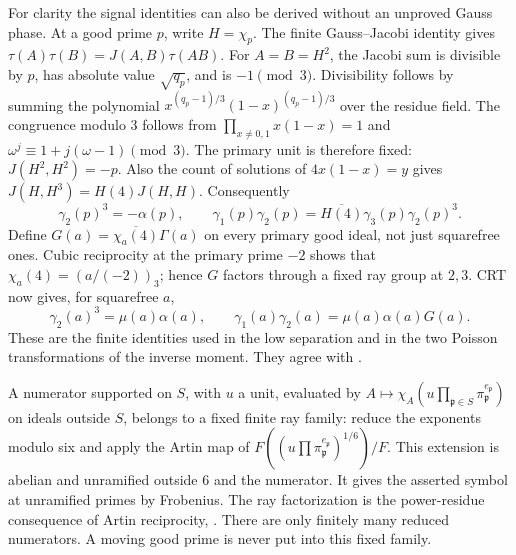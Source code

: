 \documentclass[12pt]{article}
\begin{document}
For clarity the signal identities can also be derived without an
unproved Gauss phase.  At a good prime \(p\), write \(H=\chi_p\).
The finite Gauss--Jacobi identity gives
\(\tau(A)\tau(B)=J(A,B)\tau(AB)\).
For \(A=B=H^2\), the Jacobi sum is divisible by \(p\), has
absolute value \(\sqrt{q_p}\), and is \(-1\pmod3\).
Divisibility follows by summing the polynomial
\(x^{(q_p-1)/3}(1-x)^{(q_p-1)/3}\) over the residue field.
The congruence modulo \(3\) follows from
\(\prod_{x\ne0,1}x(1-x)=1\) and
\(\omega^j\equiv1+j(\omega-1)\pmod3\).
The primary unit is therefore fixed: \(J(H^2,H^2)=-p\).
Also the count of solutions of \(4x(1-x)=y\) gives
\(J(H,H^3)=H(4)J(H,H)\).  Consequently
\[
 \gamma_2(p)^3=-\alpha(p),\qquad
 \gamma_1(p)\gamma_2(p)
       =\overline{H(4)}\gamma_3(p)\gamma_2(p)^3 .
\]
Define \(G(a)=\overline{\chi_a(4)}\Gamma(a)\) on every primary
good ideal, not just squarefree ones.
Cubic reciprocity at the primary prime \(-2\) shows that
\(\chi_a(4)=(a/(-2))_3\); hence \(G\) factors through a fixed
ray group at \(2,3\).  CRT now gives, for squarefree \(a\),
\[
 \gamma_2(a)^3=\mu(a)\alpha(a),\qquad
 \gamma_1(a)\gamma_2(a)=\mu(a)\alpha(a)G(a).
 \tag{A2}\label{eq:signal-checked}
\]
These are the finite identities used in the low separation and in
the two Poisson transformations of the inverse moment.
They agree with \cite[Lemmas 4.2--4.4]{QRH}.

A numerator supported on \(S\), with \(u\) a unit, evaluated by
\(A\mapsto\chi_A(u\prod_{\mathfrak p\in S}
\pi_{\mathfrak p}^{e_{\mathfrak p}})\) on ideals outside \(S\),
belongs to a fixed finite ray family: reduce the exponents modulo
six and apply the Artin map of
\(F((u\prod\pi_{\mathfrak p}^{e_{\mathfrak p}})^{1/6})/F\).
This extension is abelian and unramified outside \(6\) and the numerator.
It gives the asserted symbol at unramified primes by Frobenius.
The ray factorization is the power-residue consequence of
Artin reciprocity, \cite[Chapter VIII, (5.3) and (5.5)]{MilneCFT}.
There are only finitely many reduced numerators.
A moving good prime is never put into this fixed family.
\end{document}
